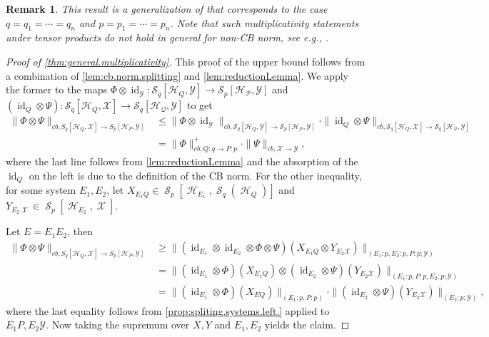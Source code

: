 \documentclass[11pt]{article}
\DeclareMathOperator{\id}{id}
\newcommand{\1}{\ensuremath{\mathbbm{1}}}
\theoremstyle{newdefinition}
\theoremstyle{newplain}
\newtheorem{remark}[definition]{Remark}
\theoremstyle{myplain}
\DeclareMathOperator{\cH}{\mathcal{H}}
\DeclareMathOperator{\cS}{\mathcal{S}}
\DeclareMathOperator{\cX}{\mathcal{X}}
\begin{document}
\begin{remark}
    This result is a generalization of \cite[Theorem 11 and Theorem 13 c)]{Devetak.2006} that corresponds to the case $q=q_1 = \cdots = q_n$ and $p=p_1 = \cdots = p_n$. Note that such multiplicativity statements under tensor products do not hold in general for non-CB norm, see e.g., \cite[Section 5]{Devetak.2006}. 
\end{remark}
\begin{proof}[Proof of \cref{thm:general.multiplicativity}]
This proof of the upper bound follows from a combination of \cref{lem:cb.norm.splitting} and \cref{lem:reductionLemma}. 
We apply the former to the maps $\Phi\otimes\id_{\mathcal{Y}}:\mathcal{S}_q[\mathcal{H}_Q,\mathcal{Y}]\to \mathcal{S}_p[\mathcal{H_P,\mathcal{Y}}]$ and $(\id_Q\otimes\Psi):\mathcal{S}_q[\mathcal{H}_Q,\mathcal{X}]\to \mathcal{S}_q[\mathcal{H_Q,\mathcal{Y}}]$ to get
\begin{align}
\|\Phi\otimes\Psi\|_{cb,S_q[\mathcal{H}_Q,\mathcal{X}]\to S_p[\mathcal{H}_P,\mathcal{Y}]} &\leq \|\Phi\otimes\id_\mathcal{Y}\|_{cb,\mathcal{S}_q[\mathcal{H}_Q,\mathcal{Y}]\to \mathcal{S}_p[\mathcal{H_P,\mathcal{Y}}]} \cdot \|\id_Q\otimes\Psi\|_{cb,\mathcal{S}_q[\mathcal{H}_Q,\mathcal{X}]\to \mathcal{S}_q[\mathcal{H_Q,\mathcal{Y}}]} \\ &= 
\|\Phi\|^+_{cb,Q:q\to P:p}\cdot \|\Psi\|_{cb,\mathcal{X}\to\mathcal{Y}},
\end{align} where the last line follows from \cref{lem:reductionLemma} and the absorption of the $\id_Q$ on the left is due to the definition of the CB norm.
For the other inequality, for some system $E_1, E_2$, let $X_{E_1Q} \in \cS_p[\cH_{E_1}, \cS_q(\cH_{Q})]$ and $Y_{E_2 \cX} \in \cS_{p}[\cH_{E_2}, \cX]$. 

Let $E=E_1E_2$, then
\begin{align}
\|\Phi\otimes\Psi\|_{cb,S_q[\mathcal{H}_Q,\mathcal{X}]\to S_p[\mathcal{H}_P,\mathcal{Y}]} &\geq \|(\id_{E_1}\otimes\id_{E_2}\otimes\Phi\otimes\Psi)(X_{E_1Q}\otimes Y_{E_2\mathcal{X}})\|_{(E_1:p,E_2:p,P:p;\mathcal{Y})} \\
    &= \|(\id_{E_1}\otimes\Phi)(X_{E_1Q})\otimes(\id_{E_2}\otimes\Psi)( Y_{E_2\mathcal{X}})\|_{(E_1:p,P:p,E_2:p;\mathcal{Y})} \\&= \|(\id_{E_1}\otimes\Phi)(X_{EQ})\|_{(E_1:p,P:p)}\cdot \|(\id_{E_2}\otimes\Psi)( Y_{E_2\mathcal{X}})\|_{(E_2:p;\mathcal{Y})},
\end{align} where the last equality follows from \cref{prop:spliting.systems.left.} applied to $E_1P,E_2\mathcal{Y}$. Now taking the supremum over $X,Y$ and $E_1,E_2$ yields the claim.


\end{proof}
\end{document}
